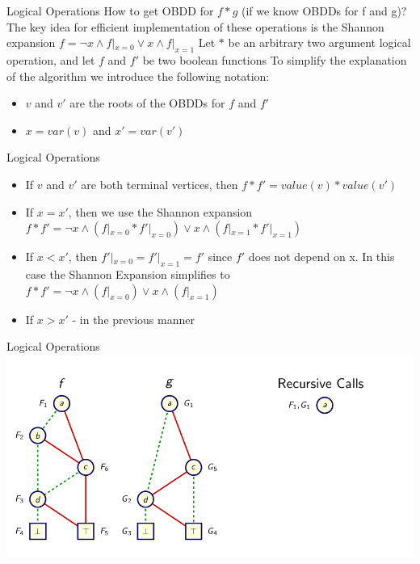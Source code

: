 \documentclass{beamer}
\begin{document}
\begin{frame}{Logical Operations}
How to get OBDD for $f * g$ (if we know OBDDs for f and g)?\newline
The key idea for efficient implementation of these operations is the Shannon expansion\newline
$f = \lnot x\wedge f|_{x = 0} \vee x\wedge f|_{x = 1}$\newline
Let $*$ be an arbitrary two argument logical operation, and let $f$ and $f'$ be two boolean functions\newline
To simplify the explanation of the algorithm we introduce the following notation:
\begin{itemize}
\item $v$ and $v'$ are the roots of the OBDDs for $f$ and $f'$
\item $x = var(v)$ and $x' = var(v')$
\end{itemize}
\end{frame}

\begin{frame}{Logical Operations}
\begin{itemize}
\item If $v$ and $v'$ are both terminal vertices, then $f * f' = value(v) * value(v')$
\item If $x = x'$, then we use the Shannon expansion $f * f' = \lnot x\wedge (f|_{x = 0} * f'|_{x = 0}) \vee x\wedge (f|_{x = 1} * f'|_{x = 1})$
\item If $x < x'$, then $f'|_{x = 0} = f'|_{x = 1} = f'$ since $f'$ does not depend on x. In this case the Shannon Expansion simplifies to $f * f' = \lnot x\wedge (f|_{x = 0}) \vee x\wedge (f|_{x = 1})$
\item If $x > x'$ - in the previous manner
\end{itemize}
\end{frame}

\begin{frame}{Logical Operations}
\includegraphics[scale=0.35]{ex1.png}
\end{frame}
\end{document}
